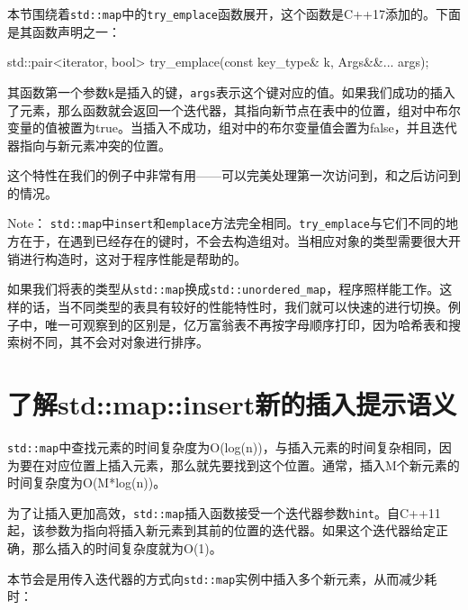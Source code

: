 
本节围绕着\texttt{std::map}中的\texttt{try\_emplace}函数展开，这个函数是C++17添加的。下面是其函数声明之一：

\begin{codebox}[cpp]
std::pair<iterator, bool> try_emplace(const key_type& k, Args&&... args);
\end{codebox}

其函数第一个参数\texttt{k}是插入的键，\texttt{args}表示这个键对应的值。如果我们成功的插入了元素，那么函数就会返回一个迭代器，其指向新节点在表中的位置，组对中布尔变量的值被置为true。当插入不成功，组对中的布尔变量值会置为false，并且迭代器指向与新元素冲突的位置。

这个特性在我们的例子中非常有用——可以完美处理第一次访问到，和之后访问到的情况。

\begin{myInfoBox}
Note： \texttt{std::map}中\texttt{insert}和\texttt{emplace}方法完全相同。\texttt{try\_emplace}与它们不同的地方在于，在遇到已经存在的键时，不会去构造组对。当相应对象的类型需要很大开销进行构造时，这对于程序性能是帮助的。
\end{myInfoBox}


如果我们将表的类型从\texttt{std::map}换成\texttt{std::unordered\_map}，程序照样能工作。这样的话，当不同类型的表具有较好的性能特性时，我们就可以快速的进行切换。例子中，唯一可观察到的区别是，亿万富翁表不再按字母顺序打印，因为哈希表和搜索树不同，其不会对对象进行排序。


\section{了解std::map::insert新的插入提示语义}

\texttt{std::map}中查找元素的时间复杂度为O(log(n))，与插入元素的时间复杂相同，因为要在对应位置上插入元素，那么就先要找到这个位置。通常，插入M个新元素的时间复杂度为O(M*log(n))。

为了让插入更加高效，\texttt{std::map}插入函数接受一个迭代器参数\texttt{hint}。自C++11起，该参数为指向将插入新元素到其前的位置的迭代器。如果这个迭代器给定正确，那么插入的时间复杂度就为O(1)。


本节会是用传入迭代器的方式向\texttt{std::map}实例中插入多个新元素，从而减少耗时：

